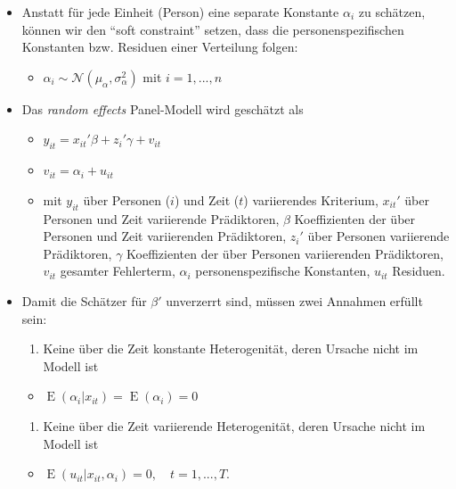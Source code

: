 \documentclass[
]{book}
\providecommand{\tightlist}{%
  \setlength{\itemsep}{0pt}\setlength{\parskip}{0pt}}
\begin{document}
\begin{itemize}
\item
  Anstatt für jede Einheit (Person) eine separate Konstante \(\alpha_i\) zu schätzen, können wir den ``soft constraint'' \citep[S. 257]{gelmanDataAnalysisUsing2006} setzen, dass die personenspezifischen Konstanten bzw. Residuen einer Verteilung folgen:

  \begin{itemize}
  \tightlist
  \item
    \(\alpha_{i} ∼ \mathcal{N}(\mu_{\alpha},\sigma^2_\alpha)\) mit \(i = 1,...,n\)
  \end{itemize}
\item
  Das \emph{random effects} Panel-Modell wird geschätzt als

  \begin{itemize}
  \tightlist
  \item
    \(y_{it}=x_{it}'\beta + z_i'\gamma + v_{it}\)
  \item
    \(v_{it} = \alpha_{i} + u_{it}\)
  \item
    mit \(y_{it}\) über Personen (\(i\)) und Zeit (\(t\)) variierendes Kriterium, \(x_{it}'\) über Personen und Zeit variierende Prädiktoren, \(\beta\) Koeffizienten der über Personen und Zeit variierenden Prädiktoren, \(z_i'\) über Personen variierende Prädiktoren, \(\gamma\) Koeffizienten der über Personen variierenden Prädiktoren, \(v_{it}\) gesamter Fehlerterm, \(\alpha_{i}\) personenspezifische Konstanten, \(u_{it}\) Residuen.
  \end{itemize}
\item
  Damit die Schätzer für \(\beta'\) unverzerrt sind, müssen zwei Annahmen erfüllt sein:

  \begin{enumerate}
  \def\labelenumi{\arabic{enumi}.}
  \tightlist
  \item
    Keine über die Zeit konstante Heterogenität, deren Ursache nicht im Modell ist
  \end{enumerate}

  \begin{itemize}
  \tightlist
  \item
    \({\displaystyle \operatorname {E} (\alpha _{i}|x_{it})=\operatorname {E} (\alpha _{i})=0}\)
  \end{itemize}

  \begin{enumerate}
  \def\labelenumi{\arabic{enumi}.}
  \setcounter{enumi}{1}
  \tightlist
  \item
    Keine über die Zeit variierende Heterogenität, deren Ursache nicht im Modell ist
  \end{enumerate}

  \begin{itemize}
  \tightlist
  \item
    \({\displaystyle \operatorname {E} (u_{it}|x_{it},\alpha _{i})=0,\quad t=1,...,T.}\)
  \end{itemize}
\end{itemize}
\end{document}
